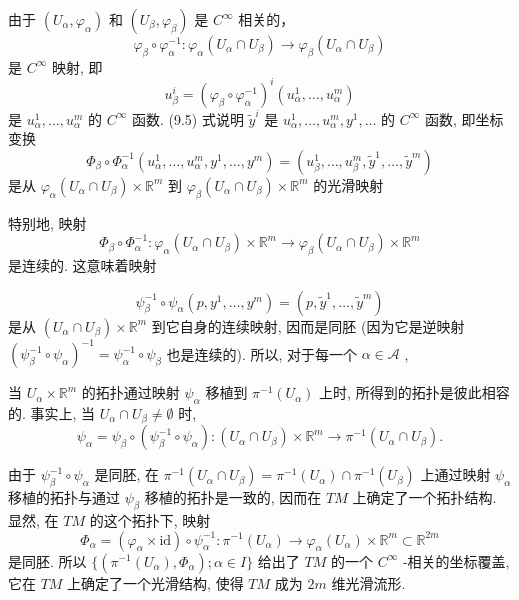 由于  $(U_{\alpha},\varphi_{\alpha})$  和  $(U_{\beta},\varphi_{\beta})$  是  $C^\infty$  相关的，
$$
\varphi_ {\beta} \circ \varphi_ {\alpha} ^ {- 1}: \varphi_ {\alpha} (U _ {\alpha} \cap U _ {\beta}) \rightarrow \varphi_ {\beta} (U _ {\alpha} \cap U _ {\beta})
$$
是  $C^\infty$  映射, 即
$$
u _ {\beta} ^ {i} = \left(\varphi_ {\beta} \circ \varphi_ {\alpha} ^ {- 1}\right) ^ {i} \left(u _ {\alpha} ^ {1}, \dots , u _ {\alpha} ^ {m}\right)
$$
是  $u_{\alpha}^{1}, \dots, u_{\alpha}^{m}$  的  $C^{\infty}$  函数. (9.5) 式说明  $\tilde{y}^{i}$  是  $u_{\alpha}^{1}, \dots, u_{\alpha}^{m}, y^{1}, \dots$  的  $C^{\infty}$  函数, 即坐标变换
$$
\Phi_ {\beta} \circ \Phi_ {\alpha} ^ {- 1} \left(u _ {\alpha} ^ {1}, \dots , u _ {\alpha} ^ {m}, y ^ {1}, \dots , y ^ {m}\right) = \left(u _ {\beta} ^ {1}, \dots , u _ {\beta} ^ {m}, \tilde {y} ^ {1}, \dots , \tilde {y} ^ {m}\right)
$$
是从  $\varphi_{\alpha}(U_{\alpha}\cap U_{\beta})\times \mathbb{R}^{m}$  到  $\varphi_{\beta}(U_{\alpha}\cap U_{\beta})\times \mathbb{R}^{m}$  的光滑映射

特别地, 映射
$$
\Phi_ {\beta} \circ \Phi_ {\alpha} ^ {- 1}: \varphi_ {\alpha} (U _ {\alpha} \cap U _ {\beta}) \times \mathbb {R} ^ {m} \rightarrow \varphi_ {\beta} (U _ {\alpha} \cap U _ {\beta}) \times \mathbb {R} ^ {m}
$$
是连续的. 这意味着映射

$$
\psi_ {\beta} ^ {- 1} \circ \psi_ {\alpha} (p, y ^ {1}, \dots , y ^ {m}) = (p, \tilde {y} ^ {1}, \dots , \tilde {y} ^ {m})
$$
是从  $(U_{\alpha} \cap U_{\beta}) \times \mathbb{R}^{m}$  到它自身的连续映射, 因而是同胚 (因为它是逆映射  $(\psi_{\beta}^{-1} \circ \psi_{\alpha})^{-1} = \psi_{\alpha}^{-1} \circ \psi_{\beta}$  也是连续的). 所以, 对于每一个  $\alpha \in \mathcal{A}$ ,

当  $U_{\alpha} \times \mathbb{R}^{m}$  的拓扑通过映射  $\psi_{\alpha}$  移植到  $\pi^{-1}(U_{\alpha})$  上时, 所得到的拓扑是彼此相容的. 事实上, 当  $U_{\alpha} \cap U_{\beta} \neq \emptyset$  时,
$$
\psi_ {\alpha} = \psi_ {\beta} \circ (\psi_ {\beta} ^ {- 1} \circ \psi_ {\alpha}): (U _ {\alpha} \cap U _ {\beta}) \times \mathbb {R} ^ {m} \rightarrow \pi^ {- 1} (U _ {\alpha} \cap U _ {\beta}).
$$

由于  $\psi_{\beta}^{-1}\circ \psi_{\alpha}$  是同胚, 在  $\pi^{-1}(U_{\alpha}\cap U_{\beta}) = \pi^{-1}(U_{\alpha})\cap \pi^{-1}(U_{\beta})$  上通过映射  $\psi_{\alpha}$  移植的拓扑与通过  $\psi_{\beta}$  移植的拓扑是一致的, 因而在  $TM$  上确定了一个拓扑结构. 显然, 在  $TM$  的这个拓扑下, 映射
$$
\Phi_ {\alpha} = \left(\varphi_ {\alpha} \times \mathrm {i d}\right) \circ \psi_ {\alpha} ^ {- 1}: \pi^ {- 1} \left(U _ {\alpha}\right)\rightarrow \varphi_ {\alpha} \left(U _ {\alpha}\right) \times \mathbb {R} ^ {m} \subset \mathbb {R} ^ {2 m}
$$
是同胚. 所以  $\{(\pi^{-1}(U_{\alpha}), \Phi_{\alpha}); \alpha \in I\}$  给出了  $TM$  的一个  $C^\infty$ -相关的坐标覆盖, 它在  $TM$  上确定了一个光滑结构, 使得  $TM$  成为  $2m$  维光滑流形.

